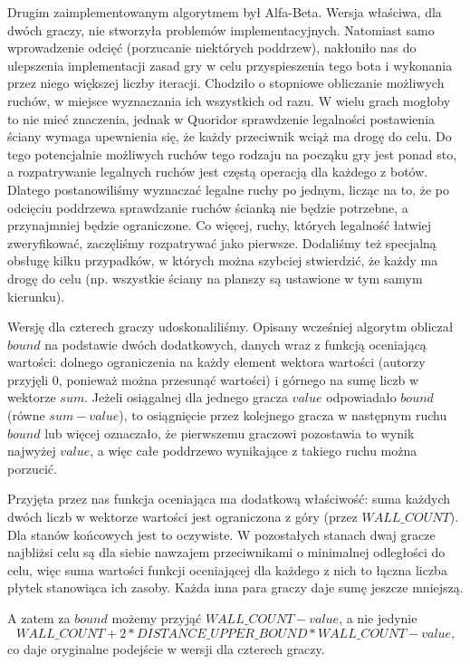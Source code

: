 \documentclass{pracamgr}
\begin{document}
Drugim zaimplementowanym algorytmem był Alfa-Beta.
Wersja właściwa, dla dwóch graczy, nie stworzyła problemów implementacyjnych.
Natomiast samo wprowadzenie odcięć (porzucanie niektórych poddrzew), nakłoniło nas do ulepszenia implementacji zasad gry w celu przyspieszenia tego bota i wykonania przez niego większej liczby iteracji.
Chodziło o stopniowe obliczanie możliwych ruchów, w miejsce wyznaczania ich wszystkich od razu.
W wielu grach mogłoby to nie mieć znaczenia, jednak w Quoridor sprawdzenie legalności postawienia ściany wymaga upewnienia się, że każdy przeciwnik wciąż ma drogę do celu.
Do tego potencjalnie możliwych ruchów tego rodzaju na począku gry jest ponad sto, a rozpatrywanie legalnych ruchów jest częstą operacją dla każdego z botów.
Dlatego postanowiliśmy wyznaczać legalne ruchy po jednym, licząc na to, że po odcięciu poddrzewa sprawdzanie ruchów ścianką nie będzie potrzebne, a przynajmniej będzie ograniczone.
Co więcej, ruchy, których legalność łatwiej zweryfikować, zaczęliśmy rozpatrywać jako pierwsze.
Dodaliśmy też specjalną obsługę kilku przypadków, w których można szybciej stwierdzić, że każdy ma drogę do celu (np. wszystkie ściany na planszy są ustawione w tym samym kierunku).

Wersję dla czterech graczy udoskonaliliśmy.
Opisany wcześniej algorytm obliczał \(bound\) na podstawie dwóch dodatkowych, danych wraz z funkcją oceniającą wartości: dolnego ograniczenia na każdy element wektora wartości (autorzy przyjęli 0, ponieważ można przesunąć wartości) i górnego na sumę liczb w wektorze \(sum\).
Jeżeli osiągalnej dla jednego gracza \(value\) odpowiadało \(bound\) (równe \(sum - value\)), to osiągnięcie przez kolejnego gracza w następnym ruchu \(bound\) lub więcej oznaczało, że pierwszemu graczowi pozostawia to wynik najwyżej \(value\), a więc całe poddrzewo wynikające z takiego ruchu można porzucić.

Przyjęta przez nas funkcja oceniająca ma dodatkową właściwość: suma każdych dwóch liczb w wektorze wartości jest ograniczona z góry (przez \(WALL\_COUNT\)).
Dla stanów końcowych jest to oczywiste.
W pozostałych stanach dwaj gracze najbliżsi celu są dla siebie nawzajem przeciwnikami o minimalnej odległości do celu, więc suma wartości funkcji oceniającej dla każdego z nich to łączna liczba płytek stanowiąca ich zasoby.
Każda inna para graczy daje sumę jeszcze mniejszą.

A zatem za \(bound\) możemy przyjąć \(WALL\_COUNT - value\), a nie jedynie \[WALL\_COUNT + 2 * DISTANCE\_UPPER\_BOUND * WALL\_COUNT - value\text{,}\] co daje oryginalne podejście w wersji dla czterech graczy.
\end{document}
